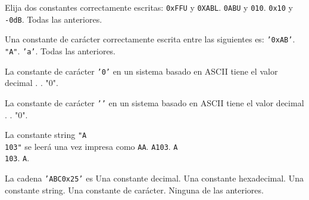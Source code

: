 
\question Elija dos constantes correctamente escritas:
\correctchoice \texttt{0xFFU} y \texttt{0XABL}.
\choice \texttt{0ABU} y \texttt{010}.
\choice \texttt{0x10} y \texttt{-0dB}.
\choice Todas las anteriores.

\question Una constante de carácter correctamente escrita entre las siguientes es:
\choice \texttt{'0xAB'}.
\choice \texttt{"A"}.
\correctchoice \texttt{'a'}.
\choice Todas las anteriores.

\question La constante de carácter \texttt{'0'} en un sistema basado en ASCII tiene el valor decimal
.
 .
\choice "0".

\question La constante de carácter \texttt{'\0'} en un sistema basado en ASCII tiene el valor decimal
.
.
\choice "0".

\question La constante string \texttt{"A\\103"} se leerá una vez impresa como
\choice \texttt{AA}.
\choice \texttt{A103}.
\choice \texttt{A\\103}.
\correctchoice \texttt{A}.

\question La cadena \texttt{'ABC0x25'} es
\choice Una constante decimal.
\choice Una constante hexadecimal.
\choice Una constante string.
\choice Una constante de carácter.
\correctchoice Ninguna de las anteriores.
